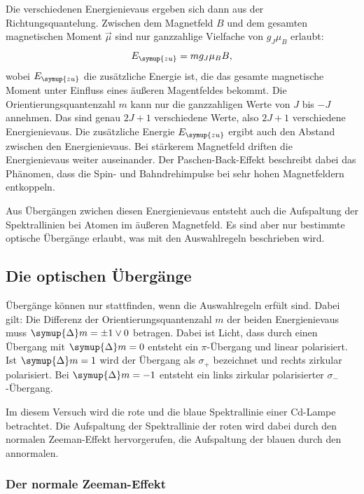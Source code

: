 Die verschiedenen Energienievaus ergeben sich dann aus der Richtungsquantelung. Zwischen dem Magnetfeld $B$ 
und dem gesamten magnetischen Moment $\vec{\mu}$ sind nur ganzzahlige Vielfache von $g_J \mu_B$ erlaubt:
\begin{equation*}
    E_{\symup{zu}} = m g_J \mu_B B,
\end{equation*}
wobei $E_{\symup{zu}}$ die zusätzliche Energie ist, die das gesamte magnetische Moment unter Einfluss 
eines äußeren Magentfeldes bekommt. Die Orientierungsquantenzahl $m$ kann nur die ganzzahligen 
Werte von $J$ bis $-J$ annehmen. Das sind genau $2J+1$ verschiedene Werte, also $2J+1$ verschiedene 
Energienievaus.
Die zusätzliche Energie $E_{\symup{zu}}$ ergibt auch den Abstand zwischen den Energienievaus. Bei stärkerem 
Magnetfeld driften die Energienievaus weiter auseinander. Der Paschen-Back-Effekt beschreibt dabei das 
Phänomen, dass die Spin- und Bahndrehimpulse bei sehr hohen Magnetfeldern entkoppeln.

Aus Übergängen zwichen diesen Energienievaus entsteht auch die Aufspaltung der Spektrallinien bei 
Atomen im äußeren Magnetfeld. Es sind aber nur bestimmte optische Übergänge erlaubt, was mit den 
Auswahlregeln beschrieben wird. 


\subsection{Die optischen Übergänge}

Übergänge können nur stattfinden, wenn die Auswahlregeln erfült sind. Dabei gilt: 
Die Differenz der Orientierungsquantenzahl $m$ der beiden Energienievaus muss $\symup{\Delta}m = \pm 1 \vee 0$ 
betragen. Dabei ist Licht, dass durch einen Übergang mit $\symup{\Delta}m=0$ entsteht ein $\pi$-Übergang 
und linear polarisiert. %
Ist $\symup{\Delta}m = 1$ wird der Übergang als $\sigma_{+}$ bezeichnet und rechts 
zirkular polarisiert. Bei $\symup{\Delta}m = -1$ entsteht ein links zirkular polarisierter $\sigma_{-}$-Übergang.

Im diesem Versuch wird die rote und die blaue Spektrallinie einer Cd-Lampe betrachtet. 
Die Aufspaltung der Spektrallinie der roten wird dabei durch den normalen Zeeman-Effekt hervorgerufen, 
die Aufspaltung der blauen durch den annormalen. 

\subsubsection{Der normale Zeeman-Effekt}

